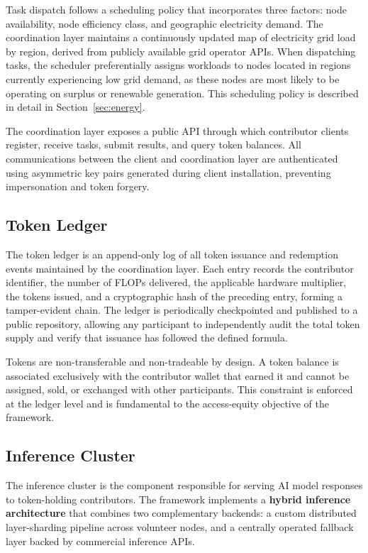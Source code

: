 \documentclass[12pt]{article}
\begin{document}
Task dispatch follows a scheduling policy that incorporates three factors: node availability, node efficiency class, and geographic electricity demand. The coordination layer maintains a continuously updated map of electricity grid load by region, derived from publicly available grid operator APIs. When dispatching tasks, the scheduler preferentially assigns workloads to nodes located in regions currently experiencing low grid demand, as these nodes are most likely to be operating on surplus or renewable generation. This scheduling policy is described in detail in Section~\ref{sec:energy}.

The coordination layer exposes a public API through which contributor clients register, receive tasks, submit results, and query token balances. All communications between the client and coordination layer are authenticated using asymmetric key pairs generated during client installation, preventing impersonation and token forgery.

\subsection{Token Ledger}

The token ledger is an append-only log of all token issuance and redemption events maintained by the coordination layer. Each entry records the contributor identifier, the number of FLOPs delivered, the applicable hardware multiplier, the tokens issued, and a cryptographic hash of the preceding entry, forming a tamper-evident chain. The ledger is periodically checkpointed and published to a public repository, allowing any participant to independently audit the total token supply and verify that issuance has followed the defined formula.

Tokens are non-transferable and non-tradeable by design. A token balance is associated exclusively with the contributor wallet that earned it and cannot be assigned, sold, or exchanged with other participants. This constraint is enforced at the ledger level and is fundamental to the access-equity objective of the framework.

\subsection{Inference Cluster}

The inference cluster is the component responsible for serving AI model responses to token-holding contributors. The framework implements a \textbf{hybrid inference architecture} that combines two complementary backends: a custom distributed layer-sharding pipeline across volunteer nodes, and a centrally operated fallback layer backed by commercial inference APIs.
\end{document}
